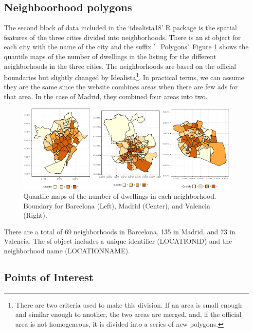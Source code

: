 \documentclass[Royal,times,sageh]{sagej}
\begin{document}
\hypertarget{neighboorhood-polygons}{%
\subsection{Neighboorhood polygons}\label{neighboorhood-polygons}}

The second block of data included in the `idealista18' R package is the
spatial features of the three cities divided into neighborhoods. There
is an sf object for each city with the name of the city and the suffix
'\_Polygons'. Figure \ref{fig:all-polygons} shows the quantile maps of
the number of dwellings in the listing for the different neighborhoods
in the three cities. The neighborhoods are based on the official
boundaries but slightly changed by
Idealista\footnote{There are two criteria used to make this division. If an area is small enough and similar enough to another, the two areas are merged, and, if the official area is not homogeneous, it is divided into a series of new polygons.}.
In practical terms, we can assume they are the same since the website
combines areas when there are few ads for that area. In the case of
Madrid, they combined four areas into two.

\begin{figure}
\centering
\includegraphics{EPB_files/figure-latex/unnamed-chunk-1-1.pdf}
\caption{\label{fig:all-polygons}Quantile maps of the number of
dwellings in each neighborhood. Boundary for Barcelona (Left), Madrid
(Center), and Valencia (Right).}
\end{figure}

There are a total of 69 neighborhoods in Barcelona, 135 in Madrid, and
73 in Valencia. The sf object includes a unique identifier (LOCATIONID)
and the neighborhood name (LOCATIONNAME).

\hypertarget{points-of-interest}{%
\subsection{Points of Interest}\label{points-of-interest}}
\end{document}
